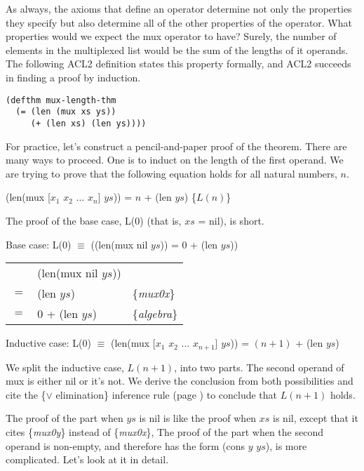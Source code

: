 As always, the axioms that define an operator
determine not only the properties they specify
but also determine all of the other properties of the operator.
What properties would we expect the mux operator to have?
Surely, the number of elements in the multiplexed list
would be the sum of the lengths of it operands.
The following ACL2 definition states this property formally,
and ACL2 succeeds in finding a proof by induction.

\label{mux-length-thm}
\begin{Verbatim}
(defthm mux-length-thm
  (= (len (mux xs ys))
     (+ (len xs) (len ys))))
\end{Verbatim}

For practice, let's construct a pencil-and-paper proof of the theorem.
There are many ways to proceed.
One is to induct on the length of the first operand.
We are trying to prove that the following equation holds for all natural numbers, $n$.

\hspace{1cm} (len(mux [$x_1$ $x_2$ $\dots$ $x_n$] $ys$)) = $n$ + (len $ys$) \hfill \{$L(n)$\}

The proof of the base case, L(0) (that is, $xs$ = nil), is short.

Base case: L(0) $\equiv$ ((len(mux nil $ys$)) = 0 + (len $ys$))

\begin{center}
\begin{tabular}{lll}
    & (len(mux nil $ys$))                             &                     \\
$=$ & (len $ys$)                                      & \{\emph{mux0x}\}    \\
$=$ & 0 + (len $ys$)                                  & \{\emph{algebra}\}  \\
\end{tabular}
\end{center}

\label{mux-length-thm-induc-case}
Inductive case: L(0) $\equiv$ (len(mux [$x_1$ $x_2$ $\dots$ $x_{n+1}$] $ys$)) = $(n+1)$ + (len $ys$)

We split the inductive case, $L(n+1)$, into two parts.
The second operand of mux is either nil or it's not.
We derive the conclusion from both possibilities and cite the \{$\vee$ elimination\}
inference rule (page \pageref{fig-02-deduction-rules})
to conclude that $L(n+1)$ holds.

The proof of the part when $ys$ is nil is like the proof when $xs$ is nil,
except that it cites \{\emph{mux0y}\} instead of \{\emph{mux0x}\},
The proof of the part when the second operand is non-empty,
and therefore has the form (cons $y$ $ys$),
is more complicated. Let's look at it in detail.

